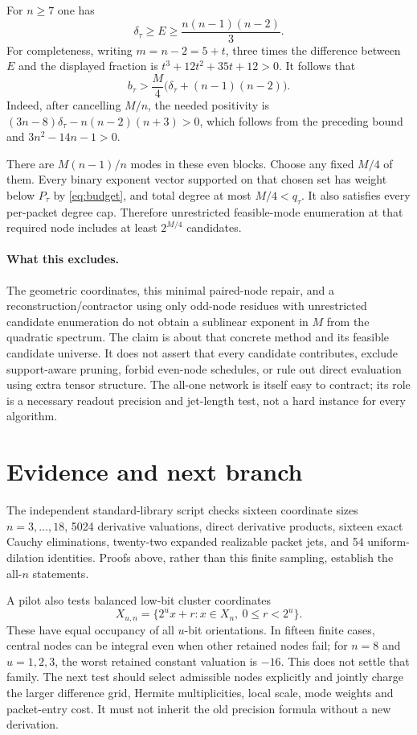\documentclass[11pt]{article}
\begin{document}
For $n\ge7$ one has
\[
 \delta_\tau\ge E\ge\frac{n(n-1)(n-2)}3.
\]
For completeness, writing $m=n-2=5+t$, three times the difference
between $E$ and the displayed fraction is
$t^3+12t^2+35t+12>0$.
It follows that
\begin{equation}
 b_\tau>
 \frac M4\bigl(\delta_\tau+(n-1)(n-2)\bigr).
 \label{eq:budget}
\end{equation}
Indeed, after cancelling $M/n$, the needed positivity is
$(3n-8)\delta_\tau-n(n-2)(n+3)>0$, which follows from the preceding
bound and $3n^2-14n-1>0$.

There are $M(n-1)/n$ modes in these even blocks. Choose any fixed $M/4$
of them. Every binary exponent vector supported on that chosen set has
weight below $P_\tau$ by \eqref{eq:budget}, and total degree at most
$M/4<q_\tau$. It also satisfies every per-packet degree cap.
Therefore unrestricted feasible-mode enumeration at that required node
includes at least $2^{M/4}$ candidates.

\paragraph{What this excludes.}
The geometric coordinates, this minimal paired-node repair, and a
reconstruction/contractor using only odd-node residues with unrestricted
candidate enumeration do not obtain a sublinear exponent in $M$ from
the quadratic spectrum. The claim is about that concrete method and
its feasible candidate universe. It does not assert that every candidate
contributes, exclude support-aware pruning, forbid even-node schedules,
or rule out direct evaluation using extra tensor structure. The all-one
network is itself easy to contract; its role is a necessary readout
precision and jet-length test, not a hard instance for every algorithm.

\section{Evidence and next branch}
The independent standard-library script checks sixteen coordinate sizes
$n=3,\ldots,18$, 5024 derivative valuations, direct derivative products,
sixteen exact Cauchy eliminations, twenty-two expanded realizable packet
jets, and 54 uniform-dilation identities. Proofs above, rather than this
finite sampling, establish the all-$n$ statements.

A pilot also tests balanced low-bit cluster coordinates
\[
 X_{u,n}=\{2^u x+r:x\in X_n,\ 0\le r<2^u\}.
\]
These have equal occupancy of all $u$-bit orientations. In fifteen finite
cases, central nodes can be integral even when other retained nodes fail;
for $n=8$ and $u=1,2,3$, the worst retained constant valuation is $-16$.
This does not settle that family. The next test should select admissible
nodes explicitly and jointly charge the larger difference grid, Hermite
multiplicities, local scale, mode weights and packet-entry cost. It must
not inherit the old precision formula without a new derivation.
\end{document}
